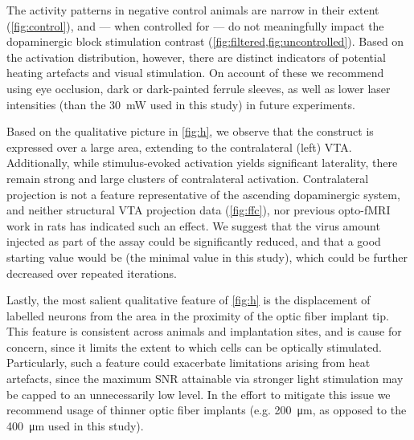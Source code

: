 The activity patterns in negative control animals are narrow in their extent (\cref{fig:control}), and --- when controlled for --- do not meaningfully impact the dopaminergic block stimulation contrast (\cref{fig:filtered,fig:uncontrolled}).
Based on the activation distribution, however, there are distinct indicators of potential heating artefacts and visual stimulation.
On account of these we recommend using eye occlusion, dark or dark-painted ferrule sleeves, as well as lower laser intensities (than the \SI{30}{\milli\watt} used in this study) in future experiments.

Based on the qualitative picture in \cref{fig:h}, we observe that the construct is expressed over a large area, extending to the contralateral (left) VTA.
Additionally, while stimulus-evoked activation yields significant laterality, there remain strong and large clusters of contralateral activation.
Contralateral projection is not a feature representative of the ascending dopaminergic system, and neither structural VTA projection data (\cref{fig:ffc}), nor previous opto-fMRI work in rats \cite{Lohani2016} has indicated such an effect.
We suggest that the virus amount injected as part of the assay could be significantly reduced, and that a good starting value would be
 (the minimal value in this study),
which could be further decreased over repeated iterations.

Lastly, the most salient qualitative feature of \cref{fig:h} is the displacement of labelled neurons from the area in the proximity of the optic fiber implant tip.
This feature is consistent across animals and implantation sites, and is cause for concern, since it limits the extent to which cells can be optically stimulated.
Particularly, such a feature could exacerbate limitations arising from heat artefacts, since the maximum SNR attainable via stronger light stimulation may be capped to an unnecessarily low level.
In the effort to mitigate this issue we recommend usage of thinner optic fiber implants (e.g. \SI{200}{\micro\meter}, as opposed to the \SI{400}{\micro\meter} used in this study).

